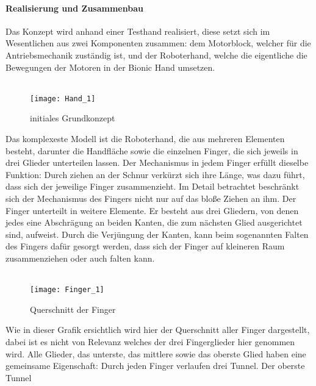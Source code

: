 \documentclass[titlepage,12pt,twoside]{article}
\begin{document}
\paragraph{Realisierung und Zusammenbau}
\label{par:Realisierung und Zusammenbau}
\hfill \break
\hfill \break
Das Konzept wird anhand einer Testhand realisiert, diese setzt sich im Wesentlichen 
aus zwei Komponenten zusammen: dem Motorblock, welcher für die Antriebsmechanik 
zuständig ist, und der Roboterhand, welche die eigentliche die Bewegungen der Motoren 
in der Bionic Hand umsetzen. \\
\\
\begin{figure}[H]
	\begin{center}
		\scalebox{0.8}
		{\texttt{[image: Hand\_1]}}
		\caption{initiales Grundkonzept}
		\label{fig:Hand_1}		
	\end{center}
\end{figure}
\hfill \break
Das komplexeste Modell ist die Roboterhand, die aus mehreren Elementen besteht, 
darunter die Handfläche sowie die einzelnen Finger, die sich jeweils in drei Glieder 
unterteilen lassen. Der Mechanismus in jedem Finger erfüllt dieselbe Funktion: Durch 
ziehen an der Schnur verkürzt sich ihre Länge, was dazu führt, dass sich der 
jeweilige Finger zusammenzieht. Im Detail betrachtet beschränkt sich der Mechanismus 
des Fingers nicht nur auf das bloße Ziehen an ihm. Der Finger unterteilt in weitere 
Elemente. Er besteht aus drei Gliedern, von denen jedes eine Abschrägung an beiden 
Kanten, die zum nächsten Glied ausgerichtet sind, aufweist. Durch die Verjüngung der 
Kanten, kann beim sogenannten Falten des Fingers dafür gesorgt werden, dass sich der 
Finger auf kleineren Raum zusammenziehen oder auch falten kann. \\
\\
\begin{figure}[H]
	\begin{center}
		\scalebox{0.8}
		{\texttt{[image: Finger\_1]}}
		\caption{Querschnitt der Finger}
		\label{fig:Finger_1}		
	\end{center}
\end{figure}
\hfill \break
Wie in dieser Grafik ersichtlich wird hier der Querschnitt aller Finger dargestellt, 
dabei ist es nicht von Relevanz welches der drei Fingerglieder hier genommen wird. 
Alle Glieder, das unterste, das mittlere sowie das oberste Glied haben eine 
gemeinsame Eigenschaft: Durch jeden Finger verlaufen drei Tunnel. Der oberste Tunnel 
\end{document}
